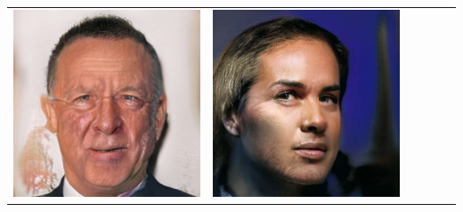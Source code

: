 \documentclass[a0,landscape]{a0poster}
\begin{document}
\begin{multicols}{3}
\begin{center}
\begin{tabular}{cc|cc|cc}
\includegraphics[width=\pganw]{../figures/pgan/60_base_iso_MH.jpg} &
\includegraphics[width=\pganw]{../figures/pgan/61_base_iso_MH.jpg} \\

\end{tabular}
\end{center}
\end{multicols}
\end{document}
